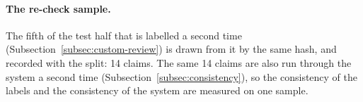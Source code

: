 \paragraph{The re-check sample.} The fifth of the test half that is
labelled a second time (Subsection~\ref{subsec:custom-review}) is
drawn from it by the same hash, and recorded with the split: 14 claims.
The same 14 claims are also run through the system a second time
(Subsection~\ref{subsec:consistency}), so the consistency of the labels
and the consistency of the system are measured on one sample.
